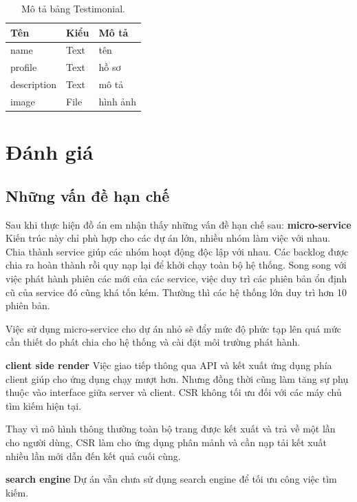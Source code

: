 \documentclass[11pt]{report}
\begin{document}
	
	\begin{table}[h!]
		\begin{center}
			\caption{Mô tả bảng Testimonial.}
			\begin{tabular}{ |l|l|l| } 
				\hline
				Tên & Kiểu & Mô tả \\
				\hline
				name & Text & tên \\
				profile & Text & hồ sơ \\
				description & Text & mô tả \\
				image & File & hình ảnh \\ 
				\hline
			\end{tabular}
			\label{table:Testimonial}
		\end{center}
	\end{table}
	
	
	
	
	
	
	\section{Đánh giá}
	\subsection{Những vấn đề hạn chế}
	Sau khi thực hiện đồ án em nhận thấy những vấn đề hạn chế sau:
	\textbf{micro-service} Kiến trúc này chỉ phù hợp cho các dự án lớn, nhiều nhóm làm việc với nhau. Chia thành service giúp các nhóm hoạt động độc lập với nhau. Các backlog được chia ra hoàn thành rồi quy nạp lại để khởi chạy toàn bộ hệ thống. Song song với việc phát hành phiên các mới của các service, việc duy trì các phiên bản ổn định cũ của service đó cũng khá tốn kém. Thường thì các hệ thống lớn duy trì hơn 10 phiên bản.
	
	Việc sử dụng micro-service cho dự án nhỏ sẽ đẩy mức độ phức tạp lên quá mức cần thiết do phát chia cho hệ thống và cài đặt môi trường phát hành.
	
	\textbf{client side render} Việc giao tiếp thông qua API và kết xuất ứng dụng phía client giúp cho ứng dụng chạy mượt hơn. Nhưng đồng thời cũng làm tăng sự phụ thuộc vào interface giữa server và client. CSR không tối ưu đối với các máy chủ tìm kiếm hiện tại.
	
	Thay vì mô hình thông thường toàn bộ trang được kết xuất và trả về một lần cho người dùng, CSR làm cho ứng dụng phân mảnh và cần nạp tải kết xuất nhiều lần mới dẫn đến kết quả cuối cùng.
	
	\textbf{search engine} Dự án vẫn chưa sử dụng search engine để tối ưu công việc tìm kiếm.
	
\end{document}
